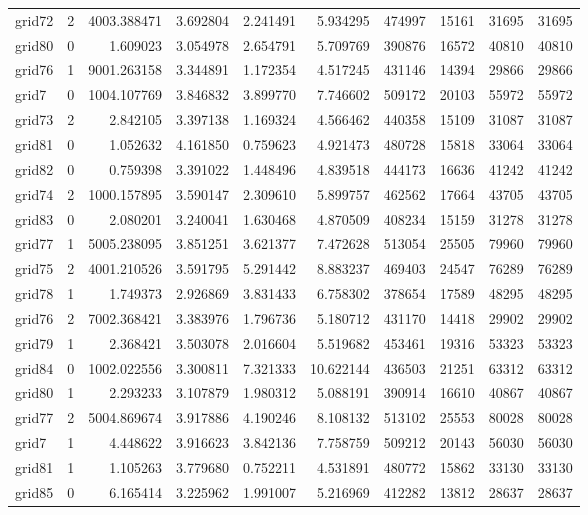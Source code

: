 \begin{longtable}{|l|r|r|r|r|r|r|r|r|r|}
grid72 & 2 & 4003.388471 & 3.692804 & 2.241491 & 5.934295 & 474997 & 15161 & 31695 & 31695 \\
grid80 & 0 & 1.609023 & 3.054978 & 2.654791 & 5.709769 & 390876 & 16572 & 40810 & 40810 \\
grid76 & 1 & 9001.263158 & 3.344891 & 1.172354 & 4.517245 & 431146 & 14394 & 29866 & 29866 \\
grid7 & 0 & 1004.107769 & 3.846832 & 3.899770 & 7.746602 & 509172 & 20103 & 55972 & 55972 \\
grid73 & 2 & 2.842105 & 3.397138 & 1.169324 & 4.566462 & 440358 & 15109 & 31087 & 31087 \\
grid81 & 0 & 1.052632 & 4.161850 & 0.759623 & 4.921473 & 480728 & 15818 & 33064 & 33064 \\
grid82 & 0 & 0.759398 & 3.391022 & 1.448496 & 4.839518 & 444173 & 16636 & 41242 & 41242 \\
grid74 & 2 & 1000.157895 & 3.590147 & 2.309610 & 5.899757 & 462562 & 17664 & 43705 & 43705 \\
grid83 & 0 & 2.080201 & 3.240041 & 1.630468 & 4.870509 & 408234 & 15159 & 31278 & 31278 \\
grid77 & 1 & 5005.238095 & 3.851251 & 3.621377 & 7.472628 & 513054 & 25505 & 79960 & 79960 \\
grid75 & 2 & 4001.210526 & 3.591795 & 5.291442 & 8.883237 & 469403 & 24547 & 76289 & 76289 \\
grid78 & 1 & 1.749373 & 2.926869 & 3.831433 & 6.758302 & 378654 & 17589 & 48295 & 48295 \\
grid76 & 2 & 7002.368421 & 3.383976 & 1.796736 & 5.180712 & 431170 & 14418 & 29902 & 29902 \\
grid79 & 1 & 2.368421 & 3.503078 & 2.016604 & 5.519682 & 453461 & 19316 & 53323 & 53323 \\
grid84 & 0 & 1002.022556 & 3.300811 & 7.321333 & 10.622144 & 436503 & 21251 & 63312 & 63312 \\
grid80 & 1 & 2.293233 & 3.107879 & 1.980312 & 5.088191 & 390914 & 16610 & 40867 & 40867 \\
grid77 & 2 & 5004.869674 & 3.917886 & 4.190246 & 8.108132 & 513102 & 25553 & 80028 & 80028 \\
grid7 & 1 & 4.448622 & 3.916623 & 3.842136 & 7.758759 & 509212 & 20143 & 56030 & 56030 \\
grid81 & 1 & 1.105263 & 3.779680 & 0.752211 & 4.531891 & 480772 & 15862 & 33130 & 33130 \\
grid85 & 0 & 6.165414 & 3.225962 & 1.991007 & 5.216969 & 412282 & 13812 & 28637 & 28637 \\

\end{longtable}
